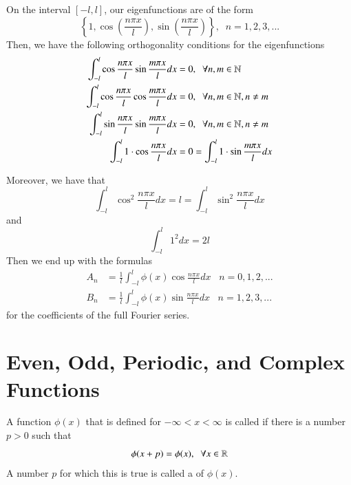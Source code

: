 \documentclass[12pt, a4paper, oneside, openright, titlepage]{book}
\begin{document}
\begin{prop}
    On the interval $[-l,l]$, our eigenfunctions are of the form \begin{equation*}
        \left\{1, \cos\left(\frac{n\pi x}{l}\right),\sin\left(\frac{n\pi x}{l}\right)\right\},\;\;n=1,2,3,...
    \end{equation*}
    Then, we have the following orthogonality conditions for the eigenfunctions \begin{align*}
        \int_{-l}^l\cos\frac{n\pi x}{l}\sin\frac{m\pi x}{l}dx &= 0,\;\;\forall n,m \in \mathbb N \\
        \int_{-l}^l\cos\frac{n\pi x}{l}\cos\frac{m\pi x}{l}dx &= 0,\;\;\forall n,m \in \mathbb N, n\neq m \\
        \int_{-l}^l\sin\frac{n\pi x}{l}\sin\frac{m\pi x}{l}dx &= 0,\;\;\forall n,m \in \mathbb N, n \neq m \\
        \int_{-l}^l1\cdot \cos\frac{n\pi x}{l}dx &= 0 = \int_{-l}^l1\cdot \sin\frac{m \pi x}{l}dx
    \end{align*}
\end{prop}
Moreover, we have that \begin{equation*}
    \int_{-l}^l\cos^2\frac{n\pi x}{l}dx = l = \int_{-l}^l\sin^2\frac{n\pi x}{l}dx
\end{equation*}
and \begin{equation*}
    \int_{-l}^l1^2dx = 2l
\end{equation*}
Then we end up with the formulas \begin{align}
    A_n &= \frac{1}{l}\int_{-l}^l\phi(x)\cos\frac{n\pi x}{l}dx\;\;\;n=0,1,2,... \\
    B_n &= \frac{1}{l}\int_{-l}^l\phi(x)\sin\frac{n\pi x}{l}dx\;\;\;n=1,2,3,...
\end{align}
for the coefficients of the full Fourier series.


\section{Even, Odd, Periodic, and Complex Functions}

\begin{defn}
    A function $\phi(x)$ that is defined for $-\infty < x < \infty$ is called  if there is a number $p > 0$ such that \begin{equation*}
        \phi(x+p) = \phi(x),\;\;\forall x \in \mathbb R
    \end{equation*}
    A number $p$ for which this is true is called a  of $\phi(x)$.
\end{defn}
\end{document}
